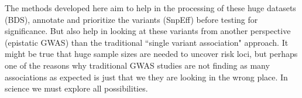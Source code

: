 The methods developed here aim to help in the processing of these huge datasets (BDS), annotate and prioritize the variants (SnpEff) before testing for significance. But also help in looking at these variants from another perspective (epistatic GWAS) than the traditional ``single variant association" approach. It might be true that huge sample sizes are needed to uncover risk loci, but perhaps one of the reasons why traditional GWAS studies are not finding as many associations as expected is just that we they are looking in the wrong place. In science we must explore all possibilities.


